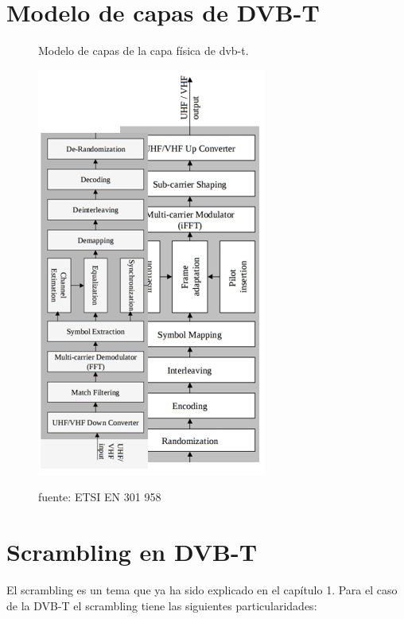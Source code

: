 \vspace{600px}
\section{Modelo de capas de DVB-T}

 \begin{figure}[h!]
	\captionsetup{justification = raggedright, singlelinecheck = false}
	\caption{Modelo de capas de la capa física de dvb-t.} 
	\centering
	\includegraphics[scale=1]{Imagenes/UHF-VHF.png}
	\label{fig:UHF-VHF}
			\caption*{fuente:  ETSI EN 301 958}
\end{figure}

\section{Scrambling en DVB-T}

El scrambling es un tema que ya ha sido explicado en el capítulo 1. Para el caso de la DVB-T el scrambling tiene las siguientes particularidades:

